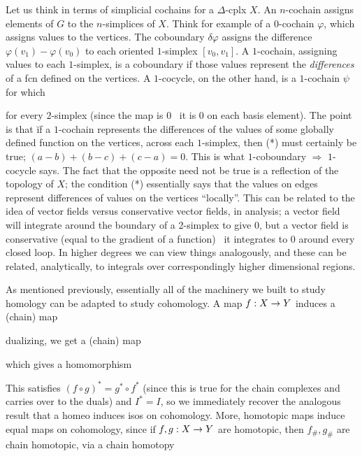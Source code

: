 \ssk

Let us think in terms of simplicial cochains for a $\Delta$-cplx $X$.
An $n$-cochain assigns elements of $G$ to the $n$-simplices of $X$. Think for 
example of a $0$-cochain $\varphi$, which assigns values to the vertices. The coboundary
$\delta\varphi$ assigns the difference $\varphi(v_1)-\varphi(v_0)$ to each oriented $1$-simplex
$[v_0,v_1]$. A $1$-cochain, assigning values to each $1$-simplex, is a coboundary
if those values represent the {\it differences} of a fcn defined on the vertices. 
A $1$-cocycle, on the other hand, is a $1$-cochain $\psi$ for which 


for every $2$-simplex (since the map is $0$ \lra\ it is $0$ on each basis element). 
The point is that \u{if} a $1$-cochain represents the differences of the values of
some globally defined function on the vertices, across each $1$-simplex, then (*)
must certainly be true; $(a-b)+(b-c)+(c-a)=0$. This is what
$1$-coboundary $\Rightarrow$ $1$-cocycle says. The fact that the opposite need not be true is a
reflection of the topology of $X$; the condition (*) essentially says
that the values on edges represent differences of values on the vertices ``locally''. 
This can be related to the idea of vector fields versus
conservative vector fields, in analysis; a vector field will integrate around the boundary of
a 2-simplex to give $0$, but a vector field is 
conservative (equal to the gradient of a function) \lra\ it integrates to $0$ around
every closed loop. In higher degrees we can view things analogously, and these can be 
related, analytically, to integrals over correspondingly higher dimensional regions.

\msk

As mentioned previously, essentially all of the machinery we built to study homology 
can be adapted to study cohomology. A map $f:X\rightarrow Y$ induces a (chain) map


dualizing, we get a (chain) map 


which gives a homomorphism 


 This satisfies $(f\circ g)^*=g^*\circ f^*$
(since this is true for the chain complexes and carries over to the duals) and $I^*=I$,
so we immediately recover the analogous result that a homeo induces isos on cohomology.
More, homotopic maps induce equal maps on cohomology, since if $f,g:X\rightarrow Y$ are homotopic, then
$f_\#,g_\#$ are chain homotopic, via a chain homotopy 

